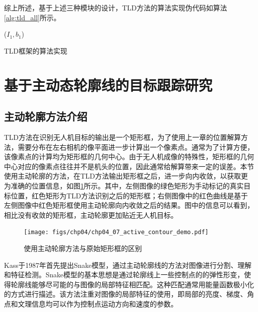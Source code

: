 综上所述，基于上述三种模块的设计，TLD方法的算法实现伪代码如算法\ref{alg:tld_all}所示。
\begin{algorithm2e}[ht]
	\SetAlgoLined
	\BlankLine
	\LearningInitialization($I_1,b_1$)\;	
	\caption{TLD框架的算法实现}
	\label{alg:tld_all}
\end{algorithm2e}



\section{基于主动态轮廓线的目标跟踪研究}
\subsection{主动轮廓方法介绍}
TLD方法在识别无人机目标的输出是一个矩形框，为了使用上一章的位置解算方法，需要分布在左右相机的像平面进一步计算出一个像素点。通常为了计算方便，该像素点的计算均为矩形框的几何中心。由于无人机成像的特殊性，矩形框的几何中心对应的像素点往往并不是机头的位置，因此通常给解算带来一定的误差。本节使用主动轮廓的方法，在TLD方法输出矩形框之后，进一步向内收敛，以获取更为准确的位置信息，如图\ref{fig:chp04_07_active_contour_demo}所示。其中，左侧图像的绿色矩形为手动标记的真实目标位置，红色矩形为TLD方法识别之后的矩形框；右侧图像中的红色曲线是基于左侧图像中红色矩形框使用主动轮廓向内收敛之后的结果。图中的信息可以看到，相比没有收敛的矩形框，主动轮廓更加贴近无人机目标。

\begin{figure}[ht]   
	\centering
	\texttt{[image: figs/chp04/chp04\_07\_active\_contour\_demo.pdf]}
	\caption{使用主动轮廓方法与原始矩形框的区别}
	\label{fig:chp04_07_active_contour_demo}
\end{figure}

Kass于1987年首先提出Snake模型\cite{kass1988snakes}，通过主动轮廓线的方法对图像进行分割、理解和特征检测。Snake模型的基本思想是通过轮廓线上一些控制点的的弹性形变，使得轮廓线能够尽可能的与图像的局部特征相匹配。这种匹配通常用能量函数极小化的方式进行描述。该方法注重对图像的局部特征的使用，即局部的亮度、梯度、角点和文理信息均可以作为控制点运动方向和速度的参数。

